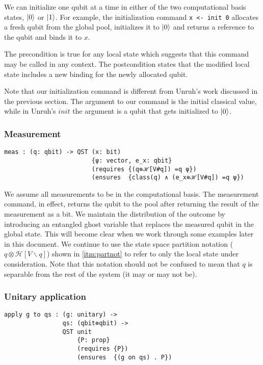 We can initialize one qubit at a time in either of the two computational basis states, $\ket{0}$ or $\ket{1}$. For example, the initialization command \lstinline[language=QHaskell]{x <- init 0} allocates a fresh qubit from the global pool, initializes it to $\ket{0}$ and returns a reference to the qubit and binds it to $x$.

The precondition is true for any local state which suggests that this command may be called in any context. The postcondition states that the modified local state includes a new binding for the newly allocated qubit.

Note that our initialization command is different from Unruh's work discussed in the previous section. The argument to our command is the initial classical value, while in Unruh's $init$ the argument is a qubit that gets initialized to $\ket{0}$.

\subsubsection{Measurement}

\begin{lstlisting}[language=QHaskell]
meas : (q: qbit) -> QST (x: bit)
                        {ψ: vector, e_x: qbit}
                        (requires {(q⊗ℋ[V#q]) =q ψ})
                        (ensures  {class(q) ∧ (e_x⊗ℋ[V#q]) =q ψ})
\end{lstlisting}

We assume all measurements to be in the computational basis. The measurement command, in effect, returns the qubit to the pool after returning the result of the measurement as a bit. We maintain the distribution of the outcome by introducing an entangled ghost variable that replaces the measured qubit in the global state. This will become clear when we work through some examples later in this document. We continue to use the state space partition notation ($q\otimes\mathcal{H}[V\backslash q]$) shown in \cref{itm:partnot} to refer to only the local state under consideration. Note that this notation should not be confused to mean that $q$ is separable from the rest of the system (it may or may not be).

\subsubsection{Unitary application}

\begin{lstlisting}[language=QHaskell]
apply g to qs : (g: unitary) ->
                qs: (qbit⊗qbit) ->
                QST unit
                    {P: prop}
                    (requires {P})
                    (ensures  {(g on qs) . P})
\end{lstlisting}

